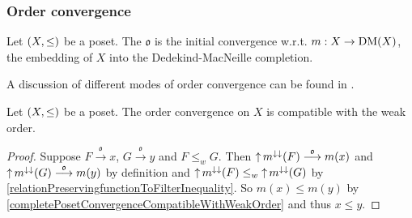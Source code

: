 \subsubsection{Order convergence}
\begin{definition}
Let $\sSet{X,\leq}$ be a poset. The  $\mathfrak{o}$ is the initial convergence w.r.t. $m: X \to \operatorname{DM}(X)$, the embedding of $X$ into the Dedekind-MacNeille completion.
\end{definition}

A discussion of different modes of order convergence can be found in \cite{abela_different_2022}.

\begin{lemma} \label{orderConvergenceCompatibleWeakOrder}
Let $\sSet{X,\leq}$ be a poset. The order convergence on $X$ is compatible with the weak order.
\end{lemma}
\begin{proof}
Suppose $F\overset{\mathfrak{o}}{\longrightarrow} x$, $G\overset{\mathfrak{o}}{\longrightarrow} y$ and $F\leq_w G$. Then $\operatorname{\uparrow} m^{\downarrow\downarrow}(F) \overset{\mathfrak{o}}{\longrightarrow} m(x)$ and $\operatorname{\uparrow} m^{\downarrow\downarrow}(G) \overset{\mathfrak{o}}{\longrightarrow} m(y)$ by definition and $\operatorname{\uparrow} m^{\downarrow\downarrow}(F) \leq_w \operatorname{\uparrow} m^{\downarrow\downarrow}(G)$ by \ref{relationPreservingfunctionToFilterInequality}. So $m(x)\leq m(y)$ by \ref{completePosetConvergenceCompatibleWithWeakOrder} and thus $x\leq y$. 
\end{proof}

